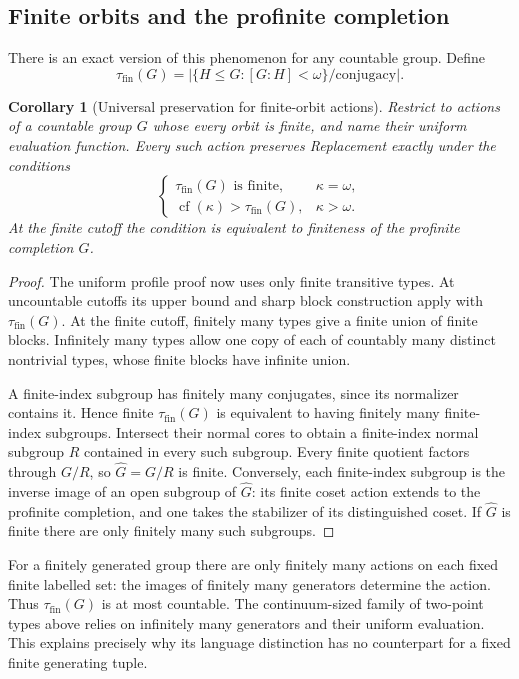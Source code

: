 \documentclass[11pt,letterpaper]{article}
\numberwithin{equation}{section}
\theoremstyle{plain}
\newtheorem{corollary}[corollary]{Corollary}
\theoremstyle{definition}
\theoremstyle{remark}
\newcommand{\cf}{\operatorname{cf}}
\begin{document}
\subsection{Finite orbits and the profinite completion}

There is an exact version of this phenomenon for any countable group.
Define
\[
 \tau_{\mathrm{fin}}(G)=
 \bigl|\{H\leq G:[G:H]<\omega\}/\text{conjugacy}\bigr|.
\]

\begin{corollary}[Universal preservation for finite-orbit actions]
\label{nee:ca:uni:finite_orbit}
Restrict to actions of a countable group $G$ whose every orbit is
finite, and name their uniform evaluation function.  Every such action
preserves Replacement exactly under the conditions
\[
 \begin{cases}
 \tau_{\mathrm{fin}}(G)\text{ is finite},&\kappa=\omega,\\
 \cf(\kappa)>\tau_{\mathrm{fin}}(G),&\kappa>\omega.
 \end{cases}
\]
At the finite cutoff the condition is equivalent to finiteness of the
profinite completion $\widehat G$.
\end{corollary}
\begin{proof}
The uniform profile proof now uses only finite transitive types.
At uncountable cutoffs its upper bound and sharp block construction
apply with $\tau_{\mathrm{fin}}(G)$.  At the finite cutoff, finitely many
types give a finite union of finite blocks.  Infinitely many types
allow one copy of each of countably many distinct nontrivial types,
whose finite blocks have infinite union.

A finite-index subgroup has finitely many conjugates, since its
normalizer contains it.  Hence finite $\tau_{\mathrm{fin}}(G)$ is
equivalent to having finitely many finite-index subgroups.  Intersect
their normal cores to obtain a finite-index normal subgroup $R$
contained in every such subgroup.  Every finite quotient factors
through $G/R$, so $\widehat G=G/R$ is finite.  Conversely, each
finite-index subgroup is the inverse image of an open subgroup of
$\widehat G$: its finite coset action extends to the profinite
completion, and one takes the stabilizer of its distinguished coset.
If $\widehat G$ is finite there are only finitely many such subgroups.
\end{proof}

For a finitely generated group there are only finitely many actions on
each fixed finite labelled set: the images of finitely many generators
determine the action.  Thus $\tau_{\mathrm{fin}}(G)$ is at most countable.
The continuum-sized family of two-point types above relies on infinitely
many generators and their uniform evaluation.  This explains precisely
why its language distinction has no counterpart for a fixed finite
generating tuple.
\end{document}
